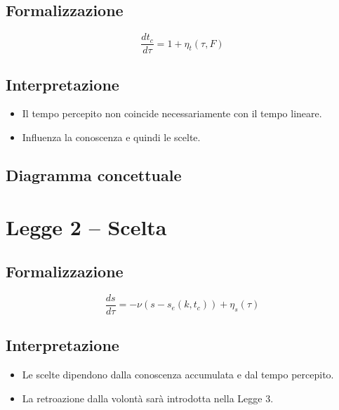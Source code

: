 \documentclass[12pt,a4paper]{article}
\begin{document}
\subsection{Formalizzazione}

\[
\frac{dt_c}{d\tau} = 1 + \eta_t(\tau,F)
\]

\subsection{Interpretazione}

\begin{itemize}
    \item Il tempo percepito non coincide necessariamente con il tempo lineare.
    \item Influenza la conoscenza e quindi le scelte.
\end{itemize}

\subsection{Diagramma concettuale}
\begin{center}
\end{center}

\newpage
\section{Legge 2 – Scelta}

\subsection{Formalizzazione}

\[
\frac{ds}{d\tau} = -\nu(s - s_e(k,t_c)) + \eta_s(\tau)
\]

\subsection{Interpretazione}

\begin{itemize}
    \item Le scelte dipendono dalla conoscenza accumulata e dal tempo percepito.
    \item La retroazione dalla volontà sarà introdotta nella Legge 3.
\end{itemize}
\end{document}
